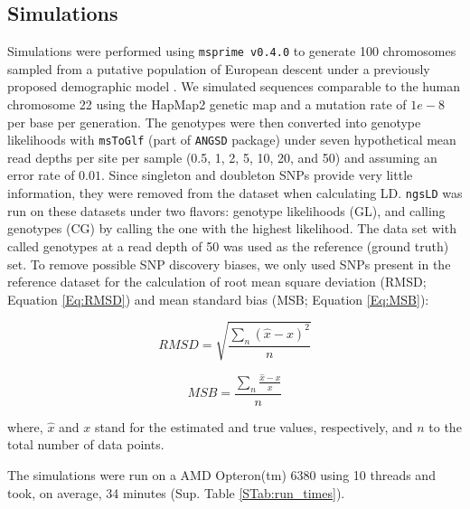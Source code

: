 \documentclass[a4paper]{article}
\begin{document}
\subsection{Simulations}
Simulations were performed using \verb|msprime v0.4.0| \citep{Kelleher2016} to generate 100 chromosomes sampled from a putative population of European descent under a previously proposed demographic model \citep{Gutenkunst2009}. We simulated sequences comparable to the human chromosome 22 using the HapMap2 genetic map and a mutation rate of $1e-8$ per base per generation. The genotypes were then converted into genotype likelihoods with \verb|msToGlf| (part of \verb|ANGSD| package) \citep{Korneliussen2013} under seven hypothetical mean read depths per site per sample (0.5, 1, 2, 5, 10, 20, and 50) and assuming an error rate of $0.01$. Since singleton and doubleton SNPs provide very little information, they were removed from the dataset when calculating LD. \verb|ngsLD| was run on these datasets under two flavors: genotype likelihoods (GL), and calling genotypes (CG) by calling the one with the highest likelihood. The data set with called genotypes at a read depth of 50 was used as the reference (ground truth) set. To remove possible SNP discovery biases, we only used SNPs present in the reference dataset for the calculation of root mean square deviation (RMSD; Equation \ref{Eq:RMSD}) and mean standard bias (MSB; Equation \ref{Eq:MSB}):

\begin{equation}
RMSD = \sqrt{\frac{\sum_n {(\hat{x} - x)^2}}{n}}
\label{Eq:RMSD}
\end{equation}

\begin{equation}
MSB = \frac{\sum_n {\frac{\hat{x} - x}{x}}}{n}
\label{Eq:MSB}
\end{equation}

\noindent where, $\hat{x}$ and $x$ stand for the estimated and true values, respectively, and $n$ to the total number of data points.

The simulations were run on a AMD Opteron(tm) 6380 using 10 threads and took, on average, 34 minutes (Sup. Table \ref{STab:run_times}).
\end{document}
